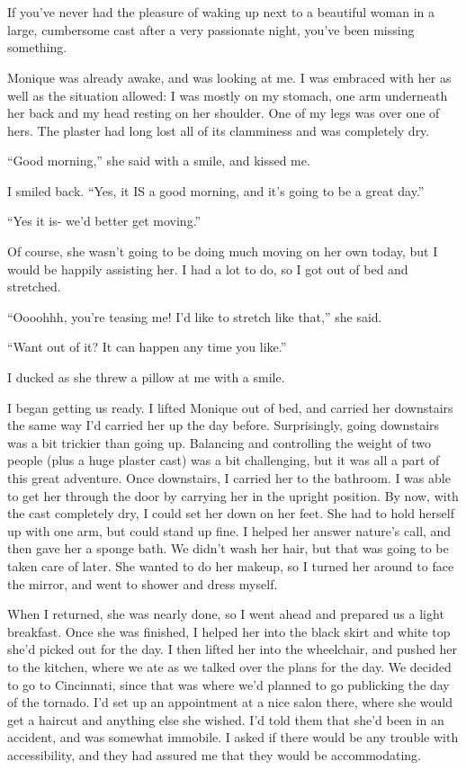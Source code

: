 \chapter{~}
If you've never had the pleasure of waking up next to a beautiful woman in a large,
cumbersome cast after a very passionate night, you've been missing something.

Monique was already awake, and was looking at me. I was embraced with her as well as the
situation allowed: I was mostly on my stomach, one arm underneath her back and my head resting
on her shoulder. One of my legs was over one of hers. The plaster had long lost all of its
clamminess and was completely dry.

``Good morning,'' she said with a smile, and kissed me.

I smiled back. ``Yes, it IS a good morning, and it's going to be a great day.''

``Yes it is- we'd better get moving.''

Of course, she wasn't going to be doing much moving on her own today, but I would be
happily assisting her. I had a lot to do, so I got out of bed and stretched.

``Oooohhh, you're teasing me! I'd like to stretch like that,'' she said.

``Want out of it? It can happen any time you like.''

I ducked as she threw a pillow at me with a smile.

I began getting us ready. I lifted Monique out of bed, and carried her downstairs the same
way I'd carried her up the day before. Surprisingly, going downstairs was a bit trickier than
going up. Balancing and controlling the weight of two people (plus a huge plaster cast) was a
bit challenging, but it was all a part of this great adventure. Once downstairs, I carried her
to the bathroom. I was able to get her through the door by carrying her in the upright position.
By now, with the cast completely dry, I could set her down on her feet. She had to hold herself
up with one arm, but could stand up fine. I helped her answer nature's call, and then gave her a
sponge bath. We didn't wash her hair, but that was going to be taken care of later. She wanted
to do her makeup, so I turned her around to face the mirror, and went to shower and dress
myself.

When I returned, she was nearly done, so I went ahead and prepared us a light breakfast.
Once she was finished, I helped her into the black skirt and white top she'd picked out for the
day. I then lifted her into the wheelchair, and pushed her to the kitchen, where we ate as we
talked over the plans for the day. We decided to go to Cincinnati, since that was where we'd
planned to go publicking the day of the tornado. I'd set up an appointment at a nice salon
there, where she would get a haircut and anything else she wished. I'd told them that she'd been
in an accident, and was somewhat immobile. I asked if there would be any trouble with
accessibility, and they had assured me that they would be accommodating.

